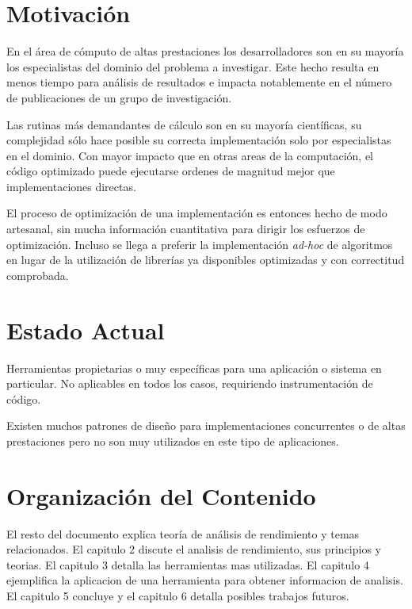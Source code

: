 \documentclass[a4paper]{report}
\begin{document}
\section{Motivaci\'on}

En el \'area de c\'omputo de altas prestaciones los desarrolladores son en su mayor\'ia los especialistas del dominio del problema a investigar.
Este hecho resulta en menos tiempo para an\'alisis de resultados e impacta notablemente en el n\'umero de publicaciones de un grupo de investigaci\'on.

\bigskip

Las rutinas m\'as demandantes de c\'alculo son en su mayor\'ia cient\'ificas, su complejidad s\'olo hace posible su correcta implementaci\'on solo por especialistas en el dominio.
Con mayor impacto que en otras areas de la computaci\'on, el c\'odigo optimizado puede ejecutarse ordenes de magnitud mejor que implementaciones directas.

\bigskip

El proceso de optimizaci\'on de una implementaci\'on es entonces hecho de modo artesanal, sin mucha informaci\'on cuantitativa para dirigir los esfuerzos de optimizaci\'on.
Incluso se llega a preferir la implementaci\'on {\em ad-hoc} de algoritmos en lugar de la utilizaci\'on de librer\'ias ya disponibles optimizadas y con correctitud comprobada.

\cite{parallel-programming}

\section{Estado Actual}

Herramientas propietarias o muy espec\'ificas para una aplicaci\'on o sistema en particular. No aplicables en todos los casos, requiriendo instrumentaci\'on de c\'odigo.

\bigskip

Existen muchos patrones de dise\~no para implementaciones concurrentes o de altas prestaciones pero no son muy utilizados en este tipo de aplicaciones.

\section{Organizaci\'on del Contenido}

El resto del documento explica teor\'ia de an\'alisis de rendimiento y temas
relacionados. El capitulo 2 discute el analisis de rendimiento, sus principios y teorias.
El capitulo 3 detalla las herramientas mas utilizadas. El capitulo 4 ejemplifica la aplicacion de una herramienta para obtener informacion de analisis.
El capitulo 5 concluye y el capitulo 6 detalla posibles trabajos futuros.
\end{document}
